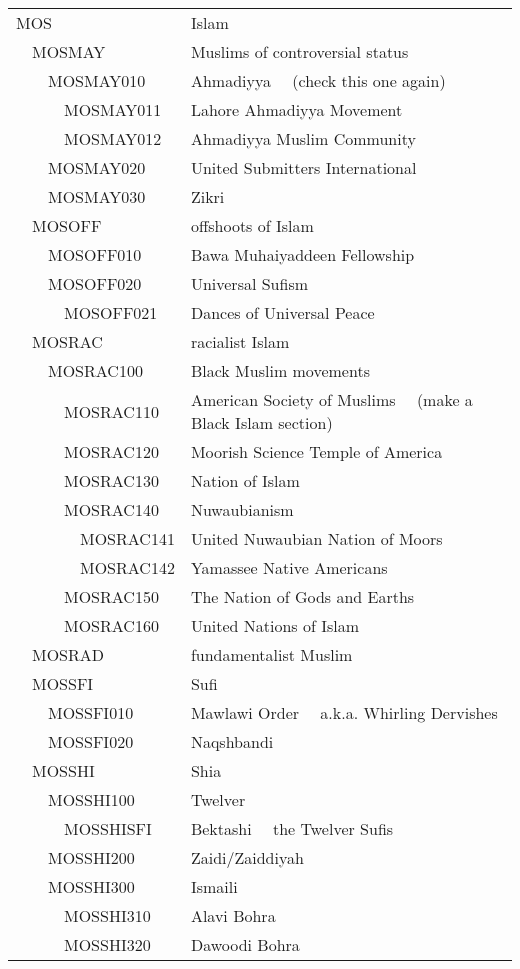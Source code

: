 \documentclass[12pt]{article}
\begin{document}
\begin{tiny}
\begin{center}
\begin{longtable}{|l|l|}
{\normalsize MOS } & {\normalsize Islam } \\
~~MOSMAY & Muslims of controversial status \\
~~~~MOSMAY010 & Ahmadiyya	~~(check this one again) \\
~~~~~~MOSMAY011 & Lahore Ahmadiyya Movement \\
~~~~~~MOSMAY012 & Ahmadiyya Muslim Community \\
~~~~MOSMAY020 & United Submitters International \\
~~~~MOSMAY030 & Zikri \\
~~MOSOFF & offshoots of Islam \\
~~~~MOSOFF010 & Bawa Muhaiyaddeen Fellowship \\
~~~~MOSOFF020 & Universal Sufism \\
~~~~~~MOSOFF021 & Dances of Universal Peace \\
~~MOSRAC & racialist Islam \\
~~~~MOSRAC100 & Black Muslim movements \\
~~~~~~MOSRAC110 & American Society of Muslims	~~(make a Black Islam section) \\
~~~~~~MOSRAC120 & Moorish Science Temple of America \\
~~~~~~MOSRAC130 & Nation of Islam \\
~~~~~~MOSRAC140 & Nuwaubianism \\
~~~~~~~~MOSRAC141 & United Nuwaubian Nation of Moors \\
~~~~~~~~MOSRAC142 & Yamassee Native Americans \\
~~~~~~MOSRAC150 & The Nation of Gods and Earths \\
~~~~~~MOSRAC160 & United Nations of Islam \\
~~MOSRAD & fundamentalist Muslim \\
~~MOSSFI & Sufi \\
~~~~MOSSFI010 & Mawlawi Order	~~a.k.a. Whirling Dervishes \\
~~~~MOSSFI020 & Naqshbandi \\
~~MOSSHI & Shia \\
~~~~MOSSHI100 & Twelver \\
~~~~~~MOSSHISFI & Bektashi	~~the Twelver Sufis \\
~~~~MOSSHI200 & Zaidi/Zaiddiyah \\
~~~~MOSSHI300 & Ismaili \\
~~~~~~MOSSHI310 & Alavi Bohra \\
~~~~~~MOSSHI320 & Dawoodi Bohra \\

\end{longtable}
\end{center}
\end{tiny}
\end{document}
